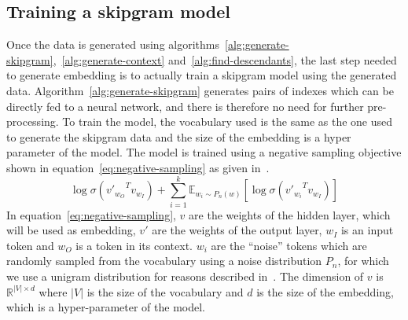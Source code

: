 \subsection{\label{ssec:train-skipgram}Training a skipgram model}
Once the data is generated using
algorithms~\ref{alg:generate-skipgram},~\ref{alg:generate-context}
and~\ref{alg:find-descendants}, the last step needed to generate embedding is to
actually train a skipgram model using the generated data.
Algorithm~\ref{alg:generate-skipgram} generates pairs of indexes which can be
directly fed to a neural network, and there is therefore no need for further
pre-processing. To train the model, the vocabulary used is the same as the one
used to generate the skipgram data and the size of the embedding is a hyper
parameter of the model. The model is trained using a negative sampling objective
shown in equation~\ref{eq:negative-sampling} as given
in~\cite{DBLP:journals/corr/MikolovSCCD13}.
%
\begin{equation}
  \label{eq:negative-sampling}
  \log \sigma \left({v'_{w_O}}^T v_{w_I} \right) + \sum_{i=1}^k \mathbb{E}_{w_i \sim P_n(w)}
  \left[ \log \sigma\left( {v'_{w_i}}^T v_{w_I} \right) \right]
\end{equation}
%
In equation~\ref{eq:negative-sampling}, $v$ are the weights of the hidden
layer, which will be used as embedding, $v'$ are the weights of the output
layer, $w_I$ is an input token and $w_O$ is a token in its context. $w_i$ are
the ``noise'' tokens which are randomly sampled from the vocabulary using a
noise distribution $P_n$, for which we use a unigram distribution for reasons
described in~\cite{DBLP:journals/corr/MikolovSCCD13}.
The dimension of $v$ is $\mathbb{R}^{|V|\times d}$ where $|V|$ is the size of
the vocabulary and $d$ is the size of the embedding, which is a hyper-parameter
of the model.
